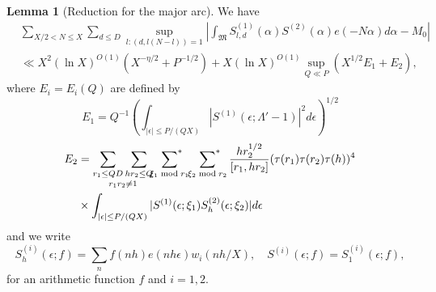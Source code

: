 \documentclass{amsart}
\theoremstyle{definition}
\newtheorem{lem}[dfn]{Lemma}
\theoremstyle{remark}
\newcommand{\1}{
    \bm{1}
}
\begin{document}
\begin{lem}[Reduction for the major arc]\label{Mred}
We have
\begin{align*}
&\sum_{X/2 < N \leq X} \sum_{d \leq D} \sup_{l:(d,l(N-l))=1} \left| \int_{\mathfrak{M}} S^{(1)}_{l,d}(\alpha) S^{(2)}(\alpha) e(-N\alpha) d\alpha - M_0 \right| \\
&\ll X^{2} (\ln{X})^{O(1)} (X^{-\eta/2} + P^{-1/2}) + X (\ln{X})^{O(1)} \sup_{Q \ll P} (X^{1/2} E_1+E_2),
\end{align*}
where $E_i=E_i(Q)$ are defined by
\[ E_1 = Q^{-1} \left( \int_{|\epsilon| \leq P/(QX)} |S^{(1)}(\epsilon;\Lambda'-1)|^2 d\epsilon \right)^{1/2} \]
\begin{align*}
E_2 &= \underset{r_1r_2 \neq 1}{\sum_{r_1 \leq QD} \sum_{h r_2 \leq Q}} \sideset{}{^*}\sum_{\xi_1 \bmod r_1} \sideset{}{^*}\sum_{\xi_2 \bmod r_2} \frac{h r^{1/2}_2}{[r_1,h r_2]} (\tau(r_1) \tau(r_2) \tau(h))^{4} \\
& \times \int_{|\epsilon| \leq P/(QX)} |S^{(1)}(\epsilon;\xi_1) S^{(2)}_{h}(\epsilon;\xi_2)| d\epsilon
\end{align*}
and we write 
\[ S^{(i)}_h(\epsilon;f) = \sum_{n} f(nh) e(nh \epsilon) w_i(nh/X), \quad S^{(i)}(\epsilon;f) = S^{(i)}_1(\epsilon;f), \]
for an arithmetic function $f$ and $i=1,2$.  
\end{lem}
\end{document}
